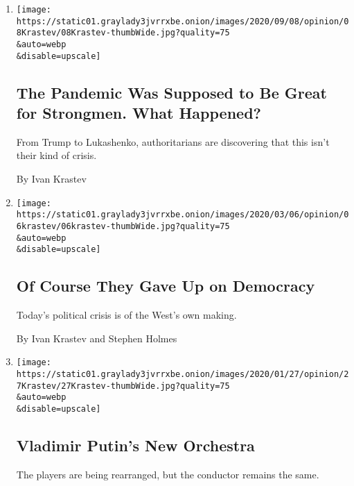 \begin{enumerate}
\def\labelenumi{\arabic{enumi}.}
\item
  \href{/2020/09/08/opinion/coronavirus-dictatorships.html}{}

  \texttt{[image: https://static01.graylady3jvrrxbe.onion/images/2020/09/08/opinion/08Krastev/08Krastev-thumbWide.jpg?quality=75\\\&auto=webp\\\&disable=upscale]}

  \hypertarget{the-pandemic-was-supposed-to-be-great-for-strongmen-what-happened}{%
  \subsection{The Pandemic Was Supposed to Be Great for Strongmen. What
  Happened?}\label{the-pandemic-was-supposed-to-be-great-for-strongmen-what-happened}}

  From Trump to Lukashenko, authoritarians are discovering that this
  isn't their kind of crisis.

  By Ivan Krastev
\item
  \href{/2020/03/09/opinion/democracy-eastern-europe.html}{}

  \texttt{[image: https://static01.graylady3jvrrxbe.onion/images/2020/03/06/opinion/06krastev/06krastev-thumbWide.jpg?quality=75\\\&auto=webp\\\&disable=upscale]}

  \hypertarget{of-course-they-gave-up-on-democracy}{%
  \subsection{Of Course They Gave Up on
  Democracy}\label{of-course-they-gave-up-on-democracy}}

  Today's political crisis is of the West's own making.

  By Ivan Krastev and Stephen Holmes
\item
  \href{/2020/01/27/opinion/putin-government-change.html}{}

  \texttt{[image: https://static01.graylady3jvrrxbe.onion/images/2020/01/27/opinion/27Krastev/27Krastev-thumbWide.jpg?quality=75\\\&auto=webp\\\&disable=upscale]}

  \hypertarget{vladimir-putins-new-orchestra}{%
  \subsection{Vladimir Putin's New
  Orchestra}\label{vladimir-putins-new-orchestra}}

  The players are being rearranged, but the conductor remains the same.


\end{enumerate}
